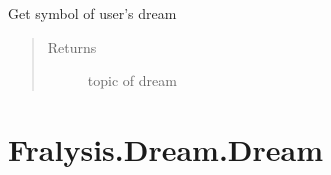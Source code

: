 \documentclass[letterpaper,10pt,english]{sphinxmanual}
\begin{document}
\begin{fulllineitems}

\begin{fulllineitems}
\label{\detokenize{index:Fralysis.Conversation.Conversation.get_topic}}
Get symbol of user’s dream
\begin{quote}\begin{description}
\item[{Returns}] \leavevmode
topic of dream

\end{description}\end{quote}

\end{fulllineitems}


\end{fulllineitems}



\chapter{Fralysis.Dream.Dream}
\label{\detokenize{index:fralysis-dream-dream}}
\end{document}
